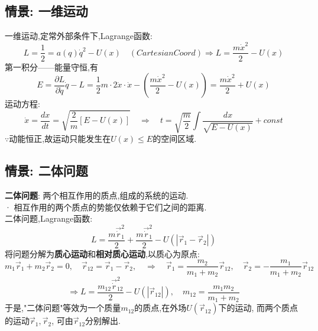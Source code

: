 \documentclass{article}
\begin{document}
\subsection{情景: 一维运动}
一维运动,定常外部条件下,Lagrange函数:
\[L = \frac{1}{2} = a(q) \dot q^2 - U(x)\quad (CartesianCoord)\Rightarrow L = \frac{m \dot x^2}{2} - U(x)\]
第一积分——能量守恒,有
\[E = \frac{\partial L}{\partial \dot q}\dot q - L = \frac{1}{2}m\cdot 2 \dot x \cdot \dot x - (\frac{m \dot x^2}{2} - U(x)) = \frac{m \dot x^2}{2} + U(x) \]
运动方程:
\[\dot x = \frac{dx}{dt} = \sqrt{\frac{2}{m}[E - U(x)]}\quad \Rightarrow \quad t = \sqrt{\frac{m}{2}} \int \frac{dx}{\sqrt{E - U(x)}} + const\]
$\because$动能恒正,故运动只能发生在$U(x) \leqslant E$的空间区域.




\subsection{情景: 二体问题}
\textbf{二体问题}: 两个相互作用的质点,组成的系统的运动.\\
· 相互作用的两个质点的势能仅依赖于它们之间的距离.\\
二体问题,Lagrange函数:
\[L = \frac{m \vec \dot r_1^2}{2} + \frac{m \vec \dot r_1^2}{2} - U(|\vec r_1 - \vec r_2|)\]
将问题分解为\textbf{质心运动}和\textbf{相对质心运动},以质心为原点:
\[m_1\vec r_1 + m_2 \vec r_2 =0,\quad \vec r_{12} = \vec r_1 - \vec r_2, \quad \Rightarrow \quad \vec r_1 = \frac{m_2}{m_1 + m_2}\vec r_{12}, \quad \vec r_2 = - \frac{m_1}{m_1 + m_2}\vec r_{12} \]
\[\Rightarrow L = \frac{m_{12} \vec \dot r_{12}^2}{2} - U(|\vec r_{12}|), \quad m_{12} = \frac{m_1 m_2}{m_1 + m_2}\]
于是,"二体问题"等效为一个质量$m_{12}$的质点,在外场$U(\vec r_{12})$下的运动, 而两个质点的运动$\vec r_1, \vec r_2$, 可由$\vec r_{12}$分别解出.
\end{document}
